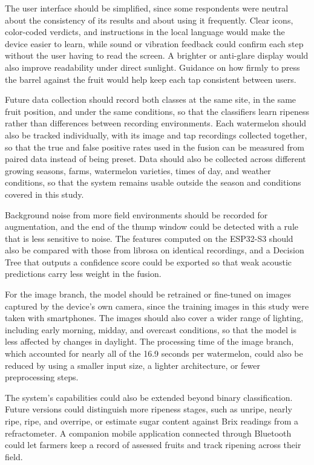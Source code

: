 \begin{thesisprose}
The user interface should be simplified, since some respondents were neutral about the consistency of its results and about using it frequently. Clear icons, color-coded verdicts, and instructions in the local language would make the device easier to learn, while sound or vibration feedback could confirm each step without the user having to read the screen. A brighter or anti-glare display would also improve readability under direct sunlight. Guidance on how firmly to press the barrel against the fruit would help keep each tap consistent between users.

Future data collection should record both classes at the same site, in the same fruit position, and under the same conditions, so that the classifiers learn ripeness rather than differences between recording environments. Each watermelon should also be tracked individually, with its image and tap recordings collected together, so that the true and false positive rates used in the fusion can be measured from paired data instead of being preset. Data should also be collected across different growing seasons, farms, watermelon varieties, times of day, and weather conditions, so that the system remains usable outside the season and conditions covered in this study.

Background noise from more field environments should be recorded for augmentation, and the end of the thump window could be detected with a rule that is less sensitive to noise. The features computed on the ESP32-S3 should also be compared with those from librosa on identical recordings, and a Decision Tree that outputs a confidence score could be exported so that weak acoustic predictions carry less weight in the fusion.

For the image branch, the model should be retrained or fine-tuned on images captured by the device's own camera, since the training images in this study were taken with smartphones. The images should also cover a wider range of lighting, including early morning, midday, and overcast conditions, so that the model is less affected by changes in daylight. The processing time of the image branch, which accounted for nearly all of the 16.9 seconds per watermelon, could also be reduced by using a smaller input size, a lighter architecture, or fewer preprocessing steps.

The system's capabilities could also be extended beyond binary classification. Future versions could distinguish more ripeness stages, such as unripe, nearly ripe, ripe, and overripe, or estimate sugar content against Brix readings from a refractometer. A companion mobile application connected through Bluetooth could let farmers keep a record of assessed fruits and track ripening across their field.


\end{thesisprose}
